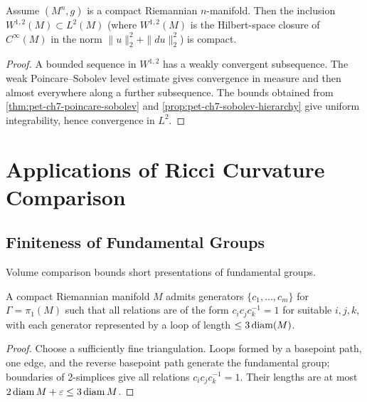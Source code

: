 \begin{theorem}
  \label{thm:pet-ch7-rellich-compactness}

  Assume $(M^n,g)$ is a compact Riemannian $n$-manifold. Then the inclusion
  $W^{1,2}(M)\subset L^2(M)$ (where $W^{1,2}(M)$ is the Hilbert-space closure
  of $C^\infty(M)$ in the norm $\|u\|_2^2+\|du\|_2^2$) is compact.
\end{theorem}
\begin{proof}
  \sketch
  A bounded sequence in \(W^{1,2}\) has a weakly convergent subsequence. The weak Poincare--Sobolev level estimate gives convergence in measure and then almost everywhere along a further subsequence. The bounds obtained from \cref{thm:pet-ch7-poincare-sobolev} and \cref{prop:pet-ch7-sobolev-hierarchy} give uniform integrability, hence convergence in \(L^2\).
\end{proof}

\section{Applications of Ricci Curvature Comparison}

\subsection{Finiteness of Fundamental Groups}

Volume comparison bounds short presentations of fundamental groups.

\begin{lemma}
  \label{lem:pet-ch7-gromov-generators}

  A compact Riemannian manifold $M$ admits generators $\{c_1,\dots,c_m\}$ for
  $\Gamma=\pi_1(M)$ such that all relations are of the form
  $c_ic_jc_k^{-1}=1$ for suitable $i,j,k$, with each generator represented by a
  loop of length $\le3\operatorname{diam}(M)$.
\end{lemma}
\begin{proof}
  \sketch
  Choose a sufficiently fine triangulation. Loops formed by a basepoint path, one edge, and the reverse basepoint path generate the fundamental group; boundaries of 2-simplices give all relations \(c_ic_jc_k^{-1}=1\). Their lengths are at most \(2\operatorname{diam} M+\varepsilon\le3\operatorname{diam} M\).
\end{proof}

